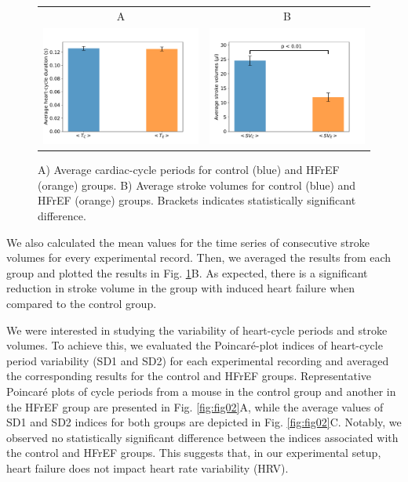\documentclass[%
preprint,
 amsmath,amssymb,
 aps,
]{revtex4-2}
\begin{document}
\begin{figure}[h!]
    \begin{tabular}{cc}
        A & B \\
        \includegraphics[width=3in]{Fig01_A.pdf} &
        \includegraphics[width=3in]{Fig01_B.pdf}
    \end{tabular}
    \caption{A) Average cardiac-cycle periods for control (blue) and HFrEF (orange) groups. B) Average stroke volumes for control (blue) and HFrEF (orange) groups. Brackets indicates statistically significant difference.}
    \label{fig:fig01}
\end{figure}

We also calculated the mean values for the time series of consecutive stroke volumes for every experimental record. Then, we averaged the results from each group and plotted the results in Fig. \ref{fig:fig01}B. As expected, there is a significant reduction in stroke volume in the group with induced heart failure when compared to the control group.

We were interested in studying the variability of heart-cycle periods and stroke volumes. To achieve this, we evaluated the Poincaré-plot indices of heart-cycle period variability (SD1 and SD2) for each experimental recording and averaged the corresponding results for the control and HFrEF groups. Representative Poincaré plots of cycle periods from a mouse in the control group and another in the HFrEF group are presented in Fig. \ref{fig:fig02}A, while the average values of SD1 and SD2 indices for both groups are depicted in Fig. \ref{fig:fig02}C. Notably, we observed no statistically significant difference between the indices associated with the control and HFrEF groups. This suggests that, in our experimental setup, heart failure does not impact heart rate variability (HRV).
\end{document}
